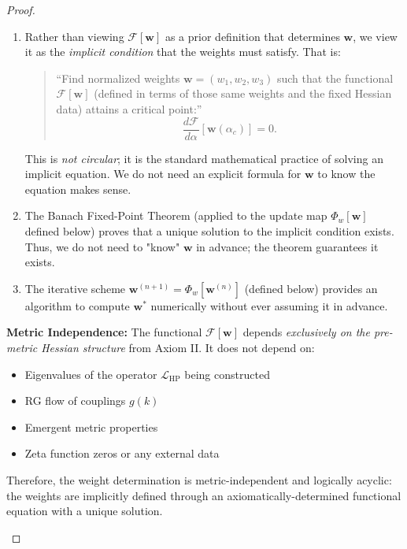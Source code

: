 \begin{lemma}
\begin{proof}
\begin{lemma}
\begin{enumerate}
\item[\textbf{(ii) Functional as Implicit Condition:}] Rather than viewing $\mathcal{F}[\mathbf{w}]$ as a prior definition that determines $\mathbf{w}$, we view it as the \textit{implicit condition} that the weights must satisfy. That is:
\begin{quote}
``Find normalized weights $\mathbf{w} = (w_1, w_2, w_3)$ such that the functional $\mathcal{F}[\mathbf{w}]$ (defined in terms of those same weights and the fixed Hessian data) attains a critical point:''
$$\frac{d\mathcal{F}}{d\alpha}[\mathbf{w}(\alpha_c)] = 0.$$
\end{quote}

This is \textit{not circular}; it is the standard mathematical practice of solving an implicit equation. We do not need an explicit formula for $\mathbf{w}$ to know the equation makes sense.

\item[\textbf{(iii) Explicit Solution Existence via Banach Theorem:}] The Banach Fixed-Point Theorem (applied to the update map $\Phi_w[\mathbf{w}]$ defined below) proves that a unique solution to the implicit condition exists. Thus, we do not need to "know" $\mathbf{w}$ in advance; the theorem guarantees it exists.

\item[\textbf{(iv) Computational Method:}] The iterative scheme $\mathbf{w}^{(n+1)} = \Phi_w[\mathbf{w}^{(n)}]$ (defined below) provides an algorithm to compute $\mathbf{w}^*$ numerically without ever assuming it in advance.
\end{enumerate}

\noindent\textbf{Metric Independence:} The functional $\mathcal{F}[\mathbf{w}]$ depends \textit{exclusively on the pre-metric Hessian structure} from Axiom II. It does not depend on:
\begin{itemize}
\item Eigenvalues of the operator $\mathcal{L}_{\mathrm{HP}}$ being constructed
\item RG flow of couplings $g(k)$
\item Emergent metric properties
\item Zeta function zeros or any external data
\end{itemize}

Therefore, the weight determination is metric-independent and logically acyclic: the weights are implicitly defined through an axiomatically-determined functional equation with a unique solution.


\end{lemma}
\end{proof}
\end{lemma}
